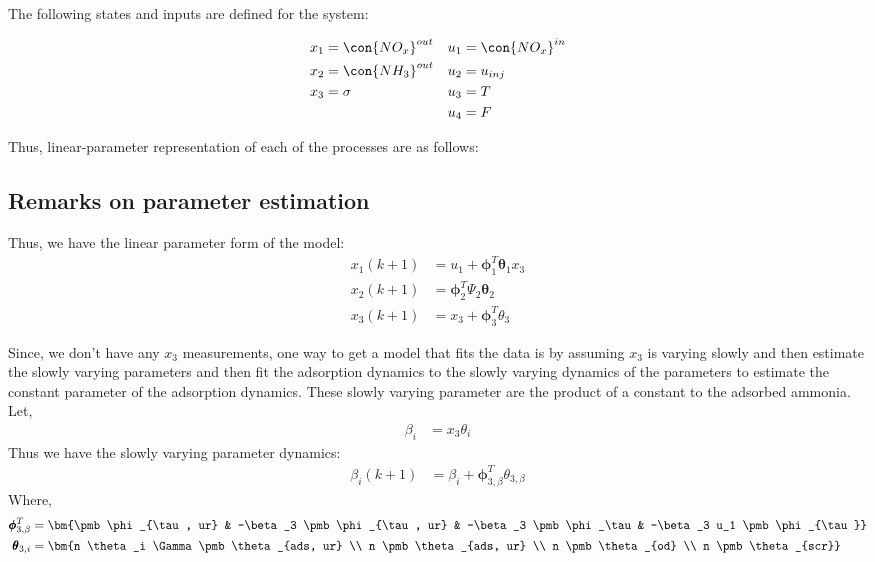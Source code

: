 The following states and inputs are defined for the system:

\begin{align*}
    x_1 &= \con{NO_x}^{out} & u_1 &= \con{NO_x}^{in} \\
    x_2 &= \con{NH_3}^{out} & u_2 &= u_{inj} \\
    x_3 &= \sigma & u_3 &= T\\
        &         & u_4 &= F
\end{align*}

Thus, linear-parameter representation of each of the processes are as follows:






\subsection{Remarks on parameter estimation}
Thus, we have the linear parameter form of the model:
\begin{align*}
    x_1(k+1) &= u_1 + \pmb \phi_1^T  \pmb \theta_1 x_3 \\
    x_2(k+1) &= \pmb \phi_2 ^T \Psi_2 \pmb \theta_2 \\
    x_3(k+1) &= x_3 + \pmb \phi_3^T \theta_3
\end{align*}

Since, we don't have any $x_3$ measurements, one way to get a model that fits the data is by assuming $x_3$ is varying slowly and then estimate the slowly varying parameters and then fit the adsorption dynamics to the slowly varying dynamics of the parameters to estimate the constant parameter of the adsorption dynamics. These slowly varying parameter are the product of a constant to the adsorbed ammonia. Let,
\begin{align*}
    \beta_i &= x_3 \theta_i
\end{align*}
Thus we have the slowly varying parameter dynamics:
\begin{align*}
    \beta_i(k+1) &= \beta_i + \pmb \phi_{3, \beta}^T \theta_{3, \beta}
\end{align*}
Where,
\begin{align*}
    \pmb \phi_{3, \beta}^T &= \bm{\pmb \phi_{\tau, ur} &
                                -\beta_3 \pmb \phi_{\tau, ur} &
                                -\beta_3 \pmb \phi_\tau  &
                                -\beta_3 u_1 \pmb \phi_{\tau}} \\
    \pmb \theta_{3, i} &= \bm{n \theta_i \Gamma \pmb \theta_{ads, ur} \\
                             n \pmb \theta_{ads, ur}    \\
                             n \pmb \theta_{od}         \\
                             n \pmb \theta_{scr}}
\end{align*}
